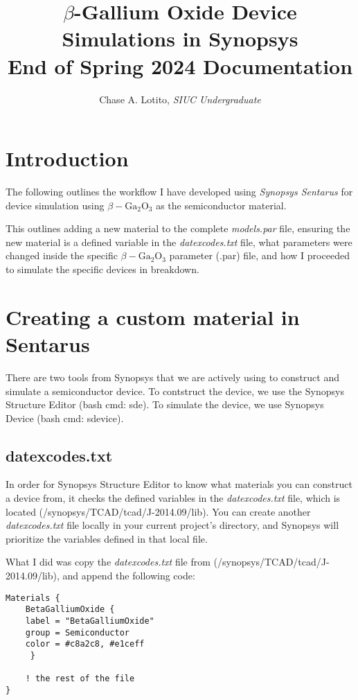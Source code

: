 \documentclass{article}
\title{\vspace{-3cm} \(\beta\)-Gallium Oxide Device Simulations in Synopsys \\ End of Spring 2024 Documentation}
\author{Chase A. Lotito, \textit{SIUC Undergraduate}}
\date{}
\begin{document}
\pagestyle{fancy}

\fancyhead{}

\maketitle %

\section{Introduction}

The following outlines the workflow I have developed using \textit{Synopsys Sentarus} for device simulation using \(\beta - \text{Ga}_2 \text{O}_3\) as the semiconductor material. 

This outlines adding a new material to the complete \textit{models.par} file, ensuring the new material is a defined variable in the \textit{datexcodes.txt} file, what parameters were changed inside the specific \(\beta - \text{Ga}_2 \text{O}_3\) parameter (.par) file, and how I proceeded to simulate the specific devices in breakdown.

\section{Creating a custom material in Sentarus}

There are two tools from Synopsys that we are actively using to construct and simulate a semiconductor device. To contstruct the device, we use the Synopsys Structure Editor (bash cmd: sde). To simulate the device, we use Synopsys Device (bash cmd: sdevice). 

\subsection{datexcodes.txt}

In order for Synopsys Structure Editor to know what materials you can construct a device from, it checks the defined variables in the \textit{datexcodes.txt} file, which is located (/synopsys/TCAD/tcad/J-2014.09/lib). You can create another \textit{datexcodes.txt} file locally in your current project's directory, and Synopsys will prioritize the variables defined in that local file. 

What I did was copy the \textit{datexcodes.txt} file from (/synopsys/TCAD/tcad/J-2014.09/lib), and append the following code:

\begin{lstlisting}
Materials {
    BetaGalliumOxide {
    label = "BetaGalliumOxide"
    group = Semiconductor
    color = #c8a2c8, #e1ceff
     }
    
    ! the rest of the file 
}
\end{lstlisting}
\end{document}
